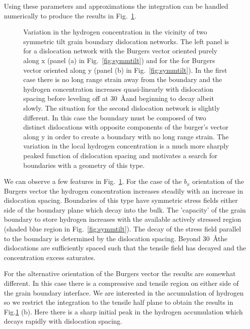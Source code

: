 \documentclass{article}
\begin{document}
Using these parameters and approximations the integration can be 
handled numerically to produce the results in Fig.~\ref{fig:intresult}.
%
\begin{figure}[!tbp]
\begin{center}
\begin{minipage}[t]{7.5cm}

\end{minipage}
\begin{minipage}[t]{7.5cm}

\end{minipage}
\caption{Variation in the hydrogen concentration in the vicinity of two
symmetric tilt grain boundary dislocation networks. The left panel is for
a dislocation network with the Burgers vector oriented purely along x (panel (a) in Fig.~\ref{fig:symmtilt})
and for the for Burgers vector oriented along y (panel (b) in Fig.~\ref{fig:symmtilt}). 
In the first case there is no long range strain
away from the boundary and the hydrogen concentration increases quasi-linearly with dislocation
spacing before leveling off at 30~\AA and beginning to decay albeit slowly. The situation for the second
dislocation network is slightly different. In this case the boundary must be composed 
of two distinct dislocations with opposite components of the burger's vector along y
in order to create a boundary with no long range strain. The variation in the 
local hydrogen concentration is a much more sharply peaked function of dislocation spacing
and motivates a search for boundaries with a geometry of this type. \label{fig:intresult}}
\end{center}
\end{figure}

We can observe a few features in Fig.~\ref{fig:intresult}. For the case
of the $b_{x}$ orientation of the Burgers vector the hydrogen concentration
increases steadily with an increase in dislocation spacing. Boundaries
of this type have symmetric stress fields either side of the boundary plane 
which decay into the bulk. The 'capacity' of the grain boundary to store hydrogen increases with
the available actively stressed region (shaded blue region in Fig.~\ref{fig:symmtilt}). 
The decay of the stress field parallel to the boundary is determined by the 
dislocation spacing. Beyond 30~\AA the dislocations are sufficiently spaced such 
that the tensile field has decayed and the concentration excess saturates.

For the alternative orientation of the Burgers vector the results are somewhat different.
In this case there is a compressive and tensile region on either side of the grain boundary
interface. We are interested in the accumulation of hydrogen so we restrict the integration
to the tensile half plane to obtain the results in Fig.\ref{fig:intresult} (b). Here there
is a sharp initial peak in the hydrogen accumulation which decays rapidly with dislocation spacing.
\end{document}
